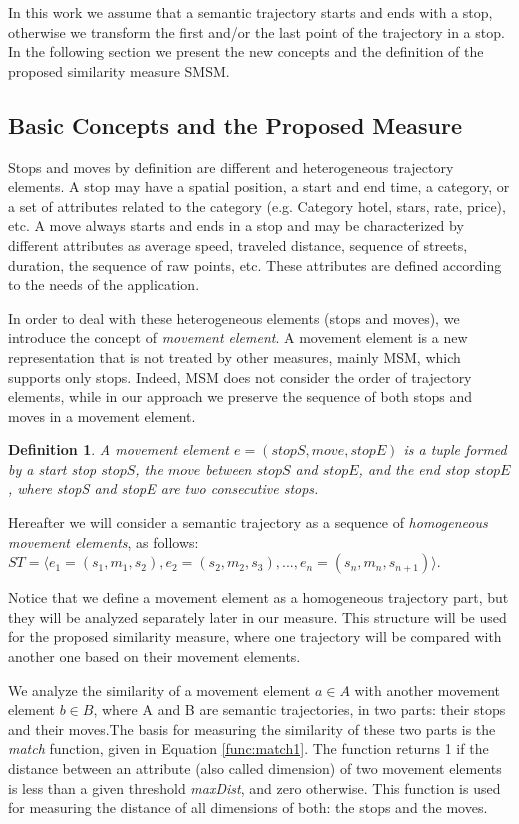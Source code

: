 \documentclass[12pt]{article}
\newtheorem{definition}{Definition}
\begin{document}
In this work we assume that a semantic trajectory starts and ends with a stop, otherwise we transform the first and/or the last point of the trajectory in a stop. In the following section we present the new concepts and the definition of the proposed similarity measure SMSM.
\subsection{Basic Concepts and the Proposed Measure}

Stops and moves by definition are different and heterogeneous trajectory elements. A stop may have a spatial position, a start and end time, a category, or a set of attributes related to the category (e.g. Category hotel, stars, rate, price), etc. A move always starts and ends in a stop and may be characterized by different attributes as average speed, traveled distance, sequence of streets, duration, the sequence of raw points, etc. These attributes are defined according to the needs of the application. 

In order to deal with these heterogeneous elements (stops and moves), we introduce the concept of \emph{movement element}. A movement element is a new representation that is not treated by other measures, mainly MSM, which supports only stops. Indeed, MSM does not consider the order of trajectory elements, while in our approach we preserve the sequence of both stops and moves in a movement element.

\begin{definition}
\label{def:movement_element}
A movement element  $e=(stopS, move, stopE)$ is a tuple formed by a start stop $stopS$, the $move$ between $stopS$ and  $stopE$, and the end stop $stopE$, where stopS and stopE are two consecutive stops.
\end{definition}


Hereafter we will consider a semantic trajectory as a sequence of \textit{homogeneous movement elements}, as follows: 
$ST=\langle e_1=(s_1,m_1,s_2), e_2=(s_2,m_2,s_3), ..., e_n=(s_n,m_n,s_{n+1}) \rangle$.

Notice that we define a movement element as a homogeneous trajectory part, but they will be analyzed separately later in our measure.
This structure will be used for the proposed similarity measure, where one trajectory will be compared with another one based on their movement elements.



We analyze the similarity of a movement element $a\in A$ with another movement element $b\in B$, where A and B are semantic trajectories, in two parts: their stops and their moves.The basis for measuring the similarity of these two parts is the \emph{match} function, given in Equation \ref{func:match1}. The function returns 1 if the distance between an attribute (also called dimension) of two movement elements is less than a given threshold \emph{maxDist}, and zero otherwise. This function is used for measuring the distance of all dimensions of both: the stops and the moves.
\end{document}
